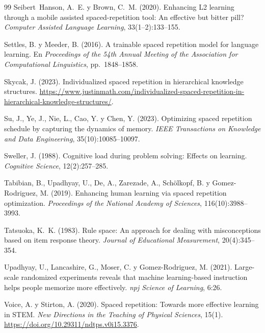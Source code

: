 \documentclass[12pt]{article}
\theoremstyle{definition}
\begin{document}
\begin{thebibliography}{99}
Seibert~Hanson, A.~E. y Brown, C.~M. (2020).
\newblock Enhancing L2 learning through a mobile assisted spaced-repetition tool: An effective but bitter pill?
\newblock \emph{Computer Assisted Language Learning}, 33(1--2):133--155.

Settles, B. y Meeder, B. (2016).
\newblock A trainable spaced repetition model for language learning.
\newblock En \emph{Proceedings of the 54th Annual Meeting of the Association for Computational Linguistics}, pp.~1848--1858.

Skycak, J. (2023).
\newblock Individualized spaced repetition in hierarchical knowledge structures.
\newblock \url{https://www.justinmath.com/individualized-spaced-repetition-in-hierarchical-knowledge-structures/}.

Su, J., Ye, J., Nie, L., Cao, Y. y Chen, Y. (2023).
\newblock Optimizing spaced repetition schedule by capturing the dynamics of memory.
\newblock \emph{IEEE Transactions on Knowledge and Data Engineering}, 35(10):10085--10097.

Sweller, J. (1988).
\newblock Cognitive load during problem solving: Effects on learning.
\newblock \emph{Cognitive Science}, 12(2):257--285.

Tabibian, B., Upadhyay, U., De, A., Zarezade, A., Schölkopf, B. y Gomez-Rodriguez, M. (2019).
\newblock Enhancing human learning via spaced repetition optimization.
\newblock \emph{Proceedings of the National Academy of Sciences}, 116(10):3988--3993.

Tatsuoka, K.~K. (1983).
\newblock Rule space: An approach for dealing with misconceptions based on item response theory.
\newblock \emph{Journal of Educational Measurement}, 20(4):345--354.

Upadhyay, U., Lancashire, G., Moser, C. y Gomez-Rodriguez, M. (2021).
\newblock Large-scale randomized experiments reveals that machine learning-based instruction helps people memorize more effectively.
\newblock \emph{npj Science of Learning}, 6:26.

Voice, A. y Stirton, A. (2020).
\newblock Spaced repetition: Towards more effective learning in STEM.
\newblock \emph{New Directions in the Teaching of Physical Sciences}, 15(1).
\newblock \url{https://doi.org/10.29311/ndtps.v0i15.3376}.


\end{thebibliography}
\end{document}
